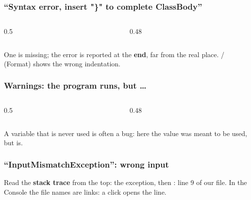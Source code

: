 \documentclass[aspectratio=169,10pt,compress]{beamer}
\begin{document}
\begin{frame}[t,fragile] \frametitle{``Syntax error, insert "\}" to complete ClassBody''}
  \begin{columns}[T]
    \begin{column}{0.5\textwidth}
    \end{column}
    \begin{column}{0.48\textwidth}
    \end{column}
  \end{columns}

  \vspace{0.2em}
  \small One \hCode{\}} is missing; the error is reported at the \textbf{end}, far from the real place.
   /  (Format) shows the wrong indentation.
\end{frame}




\begin{frame}[t,fragile] \frametitle{Warnings: the program runs, but \dots}
  \begin{columns}[T]
    \begin{column}{0.5\textwidth}
    \end{column}
    \begin{column}{0.48\textwidth}
    \end{column}
  \end{columns}

  \vspace{0.2em}
  \small A variable that is never used is often a bug: here the value  was meant to be used, but  is.
\end{frame}





\begin{frame}[t,fragile] \frametitle{``InputMismatchException'': wrong input}

  \vspace{0.2em}
  \small Read the \textbf{stack trace} from the top: the exception, then : line 9 of our file.
  In the Console the file names are links: a click opens the line.
\end{frame}
\end{document}
